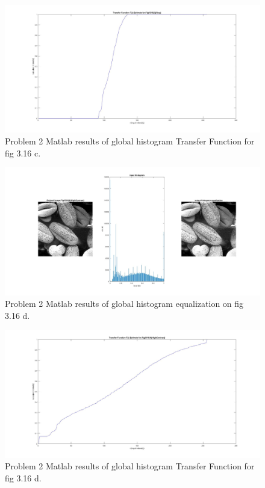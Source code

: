 \documentclass[./rarnold_report2.tex]{subfiles}
\begin{document}
	\begin{figure}[!htbp]
	\centering
	\includegraphics[scale=0.25]{"transfer3"}
	\caption{Problem 2 Matlab results of global histogram Transfer Function for fig 3.16 c.} 
	\label{Tr3}
	\end{figure}
	
	\begin{figure}[!htbp]
	\centering
	\includegraphics[scale=0.25]{"histo4"}
	\caption{Problem 2 Matlab results of global histogram equalization on fig 3.16 d.} 
	\label{histo4}
	\end{figure}
	
	\begin{figure}[!htbp]
	\centering
	\includegraphics[scale=0.25]{"transfer4"}
	\caption{Problem 2 Matlab results of global histogram Transfer Function for fig 3.16 d.} 
	\label{Tr4}
	\end{figure}
	
\end{document}

